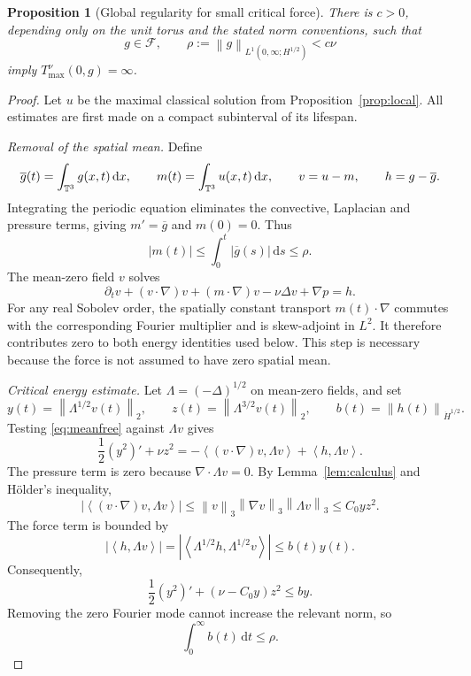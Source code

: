 \documentclass[11pt,a4paper]{article}
\newtheorem{proposition}[theorem]{Proposition}
\theoremstyle{definition}\newtheorem{definition}[theorem]{Definition}
\theoremstyle{remark}\newtheorem{remark}[theorem]{Remark}
\newcommand{\FF}{\mathcal F}\newcommand{\XX}{\mathcal X}
\newcommand{\dd}{\,\mathrm d}\newcommand{\eps}{\varepsilon}
\newcommand{\norm}[1]{\left\lVert#1\right\rVert}
\newcommand{\ip}[2]{\left\langle#1,#2\right\rangle}
\begin{document}
\begin{proposition}[Global regularity for small critical force]\label{prop:critical}
There is $c>0$, depending only on the unit torus and the stated norm conventions, such that
\begin{equation}\label{eq:smallcritical}
 g\in\FF,\qquad
 \rho:=\norm{g}_{L^1(0,\infty;H^{1/2})}<c\nu
\end{equation}
imply $T_{\max}^{\nu}(0,g)=\infty$.
\end{proposition}
\begin{proof}
Let $u$ be the maximal classical solution from Proposition~\ref{prop:local}.
All estimates are first made on a compact subinterval of its lifespan.

\emph{Removal of the spatial mean.}
Define
\[
 \overline g(t)=\int_{\TT}g(x,t)\dd x,\qquad
 m(t)=\int_{\TT}u(x,t)\dd x,\qquad
 v=u-m,\qquad h=g-\overline g.
\]
Integrating the periodic equation eliminates the convective, Laplacian and pressure terms, giving
$m'=\overline g$ and $m(0)=0$. Thus
\begin{equation}\label{eq:meanbound}
 |m(t)|\le\int_0^t|\overline g(s)|\dd s\le\rho.
\end{equation}
The mean-zero field $v$ solves
\begin{equation}\label{eq:meanfree}
 \partial_tv+(v\cdot\nabla)v+(m\cdot\nabla)v-\nu\Delta v+\nabla p=h.
\end{equation}
For any real Sobolev order, the spatially constant transport $m(t)\cdot\nabla$ commutes with the corresponding Fourier multiplier and is skew-adjoint in $L^2$. It therefore contributes zero to both energy identities used below. This step is necessary because the force is not assumed to have zero spatial mean.

\emph{Critical energy estimate.}
Let $\Lambda=(-\Delta)^{1/2}$ on mean-zero fields, and set
\[
 y(t)=\norm{\Lambda^{1/2}v(t)}_2,\qquad
 z(t)=\norm{\Lambda^{3/2}v(t)}_2,\qquad
 b(t)=\norm{h(t)}_{\dot H^{1/2}}.
\]
Testing \eqref{eq:meanfree} against $\Lambda v$ gives
\[
 \frac12(y^2)'+\nu z^2
 =-\ip{(v\cdot\nabla)v}{\Lambda v}+\ip{h}{\Lambda v}.
\]
The pressure term is zero because $\nabla\cdot\Lambda v=0$.
By Lemma~\ref{lem:calculus} and H\"older's inequality,
\[
 |\ip{(v\cdot\nabla)v}{\Lambda v}|
 \le\norm{v}_3\norm{\nabla v}_3\norm{\Lambda v}_3
 \le C_0yz^2.
\]
The force term is bounded by
\[
 |\ip{h}{\Lambda v}|
 =|\ip{\Lambda^{1/2}h}{\Lambda^{1/2}v}|\le b(t)y(t).
\]
Consequently,
\begin{equation}\label{eq:criticalenergy}
 \frac12(y^2)'+(\nu-C_0y)z^2\le by.
\end{equation}
Removing the zero Fourier mode cannot increase the relevant norm, so
\begin{equation}\label{eq:bintegral}
 \int_0^\infty b(t)\dd t\le\rho.
\end{equation}


\end{proof}
\end{document}
